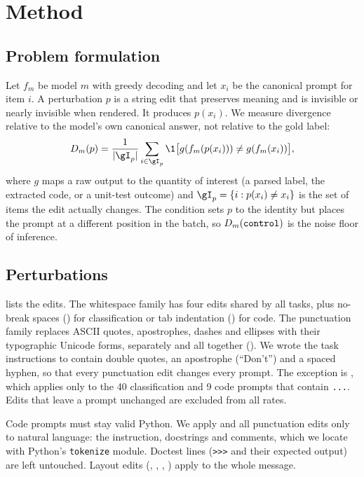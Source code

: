 \section{Method}
\label{sec:method}

\subsection{Problem formulation}
Let $f_m$ be model $m$ with greedy decoding and let $x_i$ be the canonical prompt for item $i$.
A perturbation $p$ is a string edit that preserves meaning and is invisible or nearly invisible when rendered.
It produces $p(x_i)$.
We measure divergence relative to the model's own canonical answer, not relative to the gold label:
\begin{equation}
\label{eq:div}
D_m(p) = \frac{1}{|\gI_p|}\sum_{i \in \gI_p} \1\big[g(f_m(p(x_i))) \neq g(f_m(x_i))\big],
\end{equation}
where $g$ maps a raw output to the quantity of interest (a parsed label, the extracted code, or a unit-test outcome) and $\gI_p = \{i : p(x_i) \neq x_i\}$ is the set of items the edit actually changes.
The \ctrl condition sets $p$ to the identity but places the prompt at a different position in the batch, so $D_m(\ctrl)$ is the noise floor of inference.

\subsection{Perturbations}
 lists the edits.
The whitespace family has four edits shared by all tasks, plus no-break spaces () for classification or tab indentation () for code.
The punctuation family replaces ASCII quotes, apostrophes, dashes and ellipses with their typographic Unicode forms, separately and all together ().
We wrote the task instructions to contain double quotes, an apostrophe (``Don't'') and a spaced hyphen, so that every punctuation edit changes every prompt.
The exception is , which applies only to the 40 classification and 9 code prompts that contain \texttt{...}.
Edits that leave a prompt unchanged are excluded from all rates.

Code prompts must stay valid Python.
We apply  and all punctuation edits only to natural language: the instruction, docstrings and comments, which we locate with Python's \texttt{tokenize} module.
Doctest lines (\texttt{>>>} and their expected output) are left untouched.
Layout edits (, , , ) apply to the whole message.

